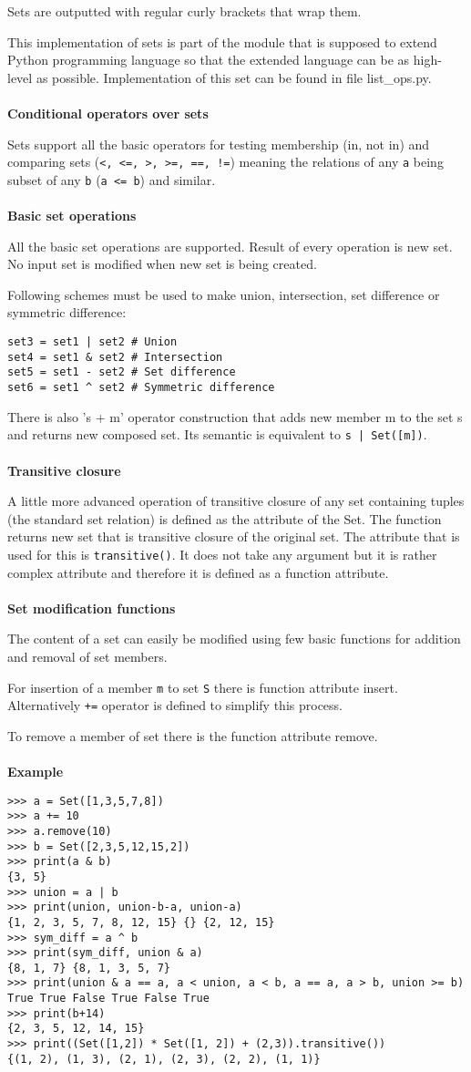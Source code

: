 \documentclass[11pt,oneside]{fithesis2}
\newcommand{\markit}[1]{\ \\\\{\noindent\textbf{#1}}}
\newcommand{\T}[1]{\texttt{#1}}
\begin{document}
Sets are outputted with regular curly brackets that wrap them.

This implementation of sets is part of the module that is supposed to extend Python programming language so that the extended language can be as high-level as possible. Implementation of this set can be found in file list\_ops.py.
\markit{Conditional operators over sets}

Sets support all the basic operators for testing membership (in, not in) and comparing sets (\T{<, <=, >, >=, ==, !=}) meaning the relations of any \T{a} being subset of any \T{b} (\T{a <= b}) and similar.
\markit{Basic set operations}

All the basic set operations are supported. Result of every operation is new set. No input set is modified when new set is being created.

Following schemes must be used to make union, intersection, set difference or symmetric difference:
\begin{lstlisting}
set3 = set1 | set2 # Union
set4 = set1 & set2 # Intersection
set5 = set1 - set2 # Set difference
set6 = set1 ^ set2 # Symmetric difference
\end{lstlisting}

There is also  's + m' operator construction that adds new member m to the set s and returns new composed set. Its semantic is equivalent to \T{s | Set([m])}.
\markit{Transitive closure}

A little more advanced operation of transitive closure of any set containing tuples (the standard set relation) is defined as the attribute of the Set. The function returns new set that is transitive closure of the original set. The attribute that is used for this is \T{transitive()}. It does not take any argument but it is rather complex attribute and therefore it is defined as a function attribute.
\markit{Set modification functions}

The content of a set can easily be modified using few basic functions for addition and removal of set members.

For insertion of a member \T{m} to set \T{S} there is function attribute insert. Alternatively \T{+=} operator is defined to simplify this process.

To remove a member of set there is the function attribute remove.
\markit{Example}
\begin{lstlisting}
>>> a = Set([1,3,5,7,8])
>>> a += 10
>>> a.remove(10)
>>> b = Set([2,3,5,12,15,2])
>>> print(a & b)
{3, 5}
>>> union = a | b
>>> print(union, union-b-a, union-a)
{1, 2, 3, 5, 7, 8, 12, 15} {} {2, 12, 15}
>>> sym_diff = a ^ b
>>> print(sym_diff, union & a)
{8, 1, 7} {8, 1, 3, 5, 7}
>>> print(union & a == a, a < union, a < b, a == a, a > b, union >= b)
True True False True False True
>>> print(b+14)
{2, 3, 5, 12, 14, 15}
>>> print((Set([1,2]) * Set([1, 2]) + (2,3)).transitive())
{(1, 2), (1, 3), (2, 1), (2, 3), (2, 2), (1, 1)}
\end{lstlisting}
\end{document}
